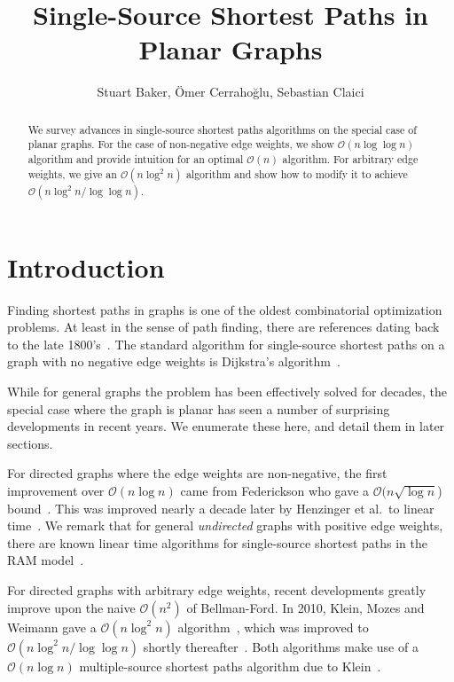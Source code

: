 \documentclass[11pt]{article}
\title{Single-Source Shortest Paths in Planar Graphs}
\author{Stuart Baker, \"{O}mer Cerraho\u{g}lu, Sebastian Claici}
\date{}
\begin{document}
\maketitle

\begin{abstract}
  We survey advances in single-source shortest paths algorithms on the special case of planar graphs. For the case of non-negative edge weights, we show $\mathcal{O}(n\log \log n)$ algorithm and provide intuition for an optimal $\mathcal{O}(n)$ algorithm. For arbitrary edge weights, we give an $\mathcal{O}(n\log^2 n)$ algorithm and show how to modify it to achieve $\mathcal{O}(n\log^2 n/\log \log n)$.
\end{abstract}

\section{Introduction}
\label{sec:introduction}

Finding shortest paths in graphs is one of the oldest combinatorial optimization problems. At least in the sense of path finding, there are references dating back to the late 1800's~\cite{wiener1873ueber}. The standard algorithm for single-source shortest paths on a graph with no negative edge weights is Dijkstra's algorithm~\cite{dijkstra1959note}.

While for general graphs the problem has been effectively solved for decades, the special case where the graph is planar has seen a number of surprising developments in recent years. We enumerate these here, and detail them in later sections.

For directed graphs where the edge weights are non-negative, the first improvement over $\mathcal{O}(n\log n)$ came from Federickson who gave a $\mathcal{O}(n \sqrt{\log n}$) bound~\cite{federickson1987fast}. This was improved nearly a decade later by Henzinger et al.\ to linear time~\cite{henzinger1997faster}. We remark that for general \emph{undirected} graphs with positive edge weights, there are known linear time algorithms for single-source shortest paths in the RAM model~\cite{thorup1999undirected}.

For directed graphs with arbitrary edge weights, recent developments greatly improve upon the naive $\mathcal{O}(n^2)$ of Bellman-Ford. In 2010, Klein, Mozes and Weimann gave a $\mathcal{O}(n \log^2 n)$ algorithm~\cite{klein2010shortest}, which was improved to $\mathcal{O}(n \log^2 n / \log \log n)$ shortly thereafter~\cite{mozes2010shortest}. Both algorithms make use of a $\mathcal{O}(n \log n)$ multiple-source shortest paths algorithm due to Klein~\cite{klein2005multiple}.
\end{document}

